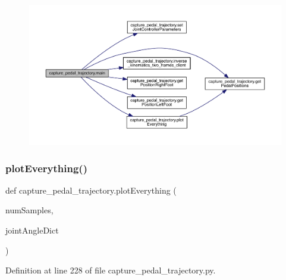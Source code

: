 \begin{figure}[H]
\begin{center}
\leavevmode
\includegraphics[width=350pt]{namespacecapture__pedal__trajectory_ae43bcee5928a71a9e44c3400a772a161_cgraph}
\end{center}
\end{figure}
\mbox{\label{namespacecapture__pedal__trajectory_a54694682225635fb5a735f159e9f059c}} 
\subsubsection{\texorpdfstring{plotEverything()}{plotEverything()}}
{\footnotesize\ttfamily def capture\+\_\+pedal\+\_\+trajectory.\+plot\+Everything (\begin{DoxyParamCaption}\item[{}]{num\+Samples,  }\item[{}]{joint\+Angle\+Dict }\end{DoxyParamCaption})}



Definition at line 228 of file capture\+\_\+pedal\+\_\+trajectory.\+py.


